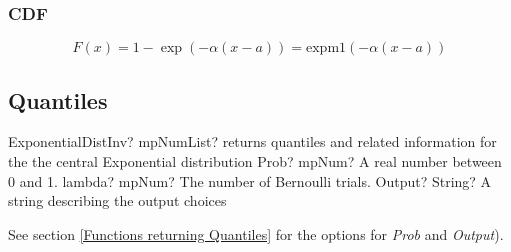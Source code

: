 \subsubsection{CDF}
%
\begin{equation} 
	F(x)=1- \exp(-\alpha (x-a)) = \text{expm1}(-\alpha (x-a))
\end{equation}



\subsection{Quantiles}


\begin{mpFunctionsExtract}
	\mpFunctionThree
	{ExponentialDistInv? mpNumList? returns quantiles and related information for the the central Exponential distribution}
	{Prob? mpNum? A real number between 0 and 1.}
	{lambda? mpNum? The number of Bernoulli trials.}
	{Output? String? A string describing the output choices}
\end{mpFunctionsExtract}

\vspace{0.3cm}
See section \ref{Functions returning Quantiles} for the options for  {\itshape\sffamily Prob} and {\itshape\sffamily Output}). 

%

